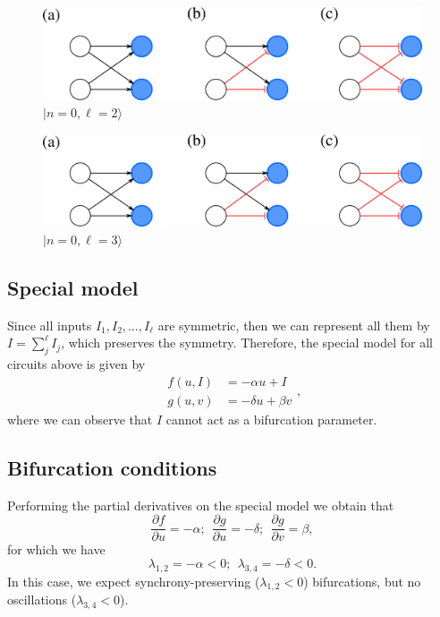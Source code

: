 \documentclass[12pt]{article}
\begin{document}
\begin{figure}[H]
    \centering
    \includegraphics[scale=0.5]{figs/n0l2_ecoli.png}
    \caption{$|n=0, \ell = 2\rangle$}
    \label{fig:fig1_l2}
\end{figure}

\begin{figure}[H]
    \centering
    \includegraphics[scale=0.5]{figs/n0l2_ecoli.png}
    \caption{$|n=0, \ell = 3\rangle$}
    \label{fig:fig1_l2}
\end{figure}

\subsection{Special model}

Since all inputs $I_1, I_2, \dots, I_{\ell}$ are
symmetric, then we can represent all them by 
$I = \sum_j^{\ell} I_j$, which preserves the symmetry.
Therefore, the special model for all circuits above
is given by
\begin{equation}
    \begin{aligned}
        f(u, I) &= -\alpha u + I\\
        g(u, v) &= -\delta u + \beta v
    \end{aligned},
\end{equation}
where we can observe that $I$ cannot act as a bifurcation
parameter.

\subsection{Bifurcation conditions}

Performing the partial derivatives on the special model
we obtain that
\begin{equation}
    \dfrac{\partial f}{\partial u} = -\alpha; \ \ 
    \dfrac{\partial g}{\partial u} = -\delta; \ \
    \dfrac{\partial g}{\partial v} = \beta, 
\end{equation}
for which we have
\begin{equation}
    \lambda_{1,2} = -\alpha < 0; \ \ 
    \lambda_{3,4} = -\delta <0.
\end{equation}
In this case, we expect synchrony-preserving
($\lambda_{1,2} < 0$) 
bifurcations, but no oscillations 
($\lambda_{3,4} < 0$).
\end{document}
